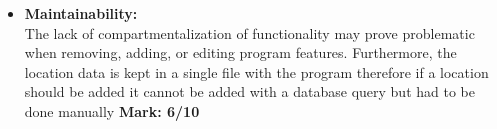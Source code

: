 \begin{itemize}
	
	\item \textbf{Maintainability:}\\The lack of compartmentalization of functionality may prove problematic when  removing, adding, or editing program features. Furthermore, the location data is kept in a single file with the program therefore if a location should be added it cannot be added with a database query but had to be done manually \textbf{Mark: 6/10}
	
	
\end{itemize}